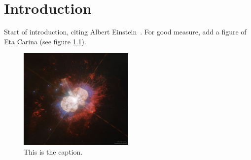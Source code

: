 \chapter{Introduction}
\label{chapter:intro}

Start of introduction, citing Albert Einstein~\citep{Einstein:1915ca,Einstein:1916vd}. For good measure, add a figure of Eta Carina (see figure \ref{fig:etac}).

\begin{figure}
\includegraphics[width=0.5\textwidth]{fig/etac.jpg}
\caption{This is the caption.}
\label{fig:etac}
\end{figure}

